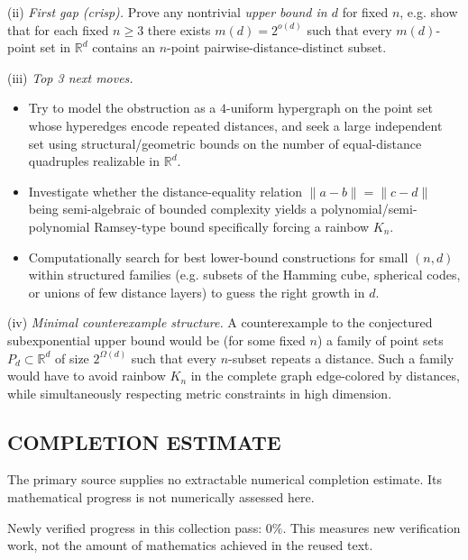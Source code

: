 (ii) \emph{First gap (crisp).} Prove any nontrivial \emph{upper bound in $d$} for fixed $n$, e.g. show that for each fixed $n\ge 3$ there exists $m(d)=2^{o(d)}$ such that every $m(d)$-point set in $\mathbb{R}^d$ contains an $n$-point pairwise-distance-distinct subset.

(iii) \emph{Top 3 next moves.}
\begin{itemize}
\item Try to model the obstruction as a $4$-uniform hypergraph on the point set whose hyperedges encode repeated distances, and seek a large independent set using structural/geometric bounds on the number of equal-distance quadruples realizable in $\mathbb{R}^d$.
\item Investigate whether the distance-equality relation $\|a-b\|=\|c-d\|$ being semi-algebraic of bounded complexity yields a polynomial/semi-polynomial Ramsey-type bound specifically forcing a rainbow $K_n$.
\item Computationally search for best lower-bound constructions for small $(n,d)$ within structured families (e.g. subsets of the Hamming cube, spherical codes, or unions of few distance layers) to guess the right growth in $d$.
\end{itemize}

(iv) \emph{Minimal counterexample structure.} A counterexample to the conjectured subexponential upper bound would be (for some fixed $n$) a family of point sets $P_d\subset\mathbb{R}^d$ of size $2^{\Omega(d)}$ such that every $n$-subset repeats a distance. Such a family would have to avoid rainbow $K_n$ in the complete graph edge-colored by distances, while simultaneously respecting metric constraints in high dimension.




\subsection*{COMPLETION ESTIMATE}
The primary source supplies no extractable numerical completion estimate. Its mathematical progress is not numerically assessed here.

Newly verified progress in this collection pass: $0\%$. This measures new verification work, not the amount of mathematics achieved in the reused text.
